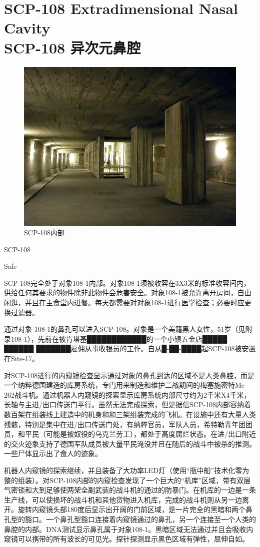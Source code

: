 \chapter[SCP-108 异次元鼻腔]{
    SCP-108 Extradimensional Nasal Cavity\\
    SCP-108 异次元鼻腔
}

\label{chap:SCP-108}

\begin{figure}[H]
    \centering
    \includegraphics[width=0.5\linewidth]{images/SCP-108.jpg}
    \caption*{SCP-108内部}
\end{figure}

SCP-108

Safe

SCP-108完全处于对象108-1内部。对象108-1须被收容在3X3米的标准收容间内，供给任何其要求的物件除非此物件会危害安全。对象108-1被允许离开房间，自由闲逛，并且在主食堂内进餐。每天都需要对对象108-1进行医学检查；必要时应更换过滤器。

通过对象-108-1的鼻孔可以进入SCP-108。对象是一个美籍黑人女性，51岁（见附录108-1），先前在被肯塔基████████████的一个小镇五金店█████ ██████ ███████雇佣从事收银员的工作。自从█-██-████起SCP-108被安置在Site-17。

对SCP-108进行的内窥镜检查显示通过对象的鼻孔到达的区域不是人类鼻腔，而是一个纳粹德国建造的库房系统，专门用来制造和维护二战期间的梅塞施密特Me 262战斗机。通过机器人内窥镜的探索显示库房系统内部尺寸约为2千米X4千米，长轴与主进\slash 出口传送门平行。虽然无法完成探索，但是据信SCP-108内部容纳着数百架在组装线上建造中的机身和和三架组装完成的飞机。在设施中还有大量人类残骸，特别是集中在进\slash 出口传送门处，有纳粹官员，军队人员，希特勒青年团团员，和平民（可能是被奴役的乌克兰劳工），都处于高度腐烂状态。在进\slash 出口附近的交火迹象支持了德国军队成员被大量平民淹没并且在随后的战斗中被杀的推测。一些尸体显示出了食人的迹象。

机器人内窥镜的探索继续，并且装备了大功率LED灯（使用“瓶中船”技术化零为整的组装）。对SCP-108内部的内窥检查发现了一个巨大的“机库”区域，带有双层气密锁和大到足够使两架全副武装的战斗机的通过的防暴门。在机库的一边是一条生产线，可以使损坏的战斗机和其他货物进入机库，完成的战斗机则从另一边离开。旋转内窥镜头部180度后显示出开阔的门前区域，是一片完全的黑暗和两个鼻孔型的豁口。一个鼻孔型豁口连接着内窥镜通过的鼻孔，另一个连接至一个人类的鼻腔的内部。DNA测试显示鼻孔属于对象108-1。黑暗区域无法通过并且会吸收内窥镜可以携带的所有波长的可见光。探针探测显示黑色区域有弹性，屈伸自如。

